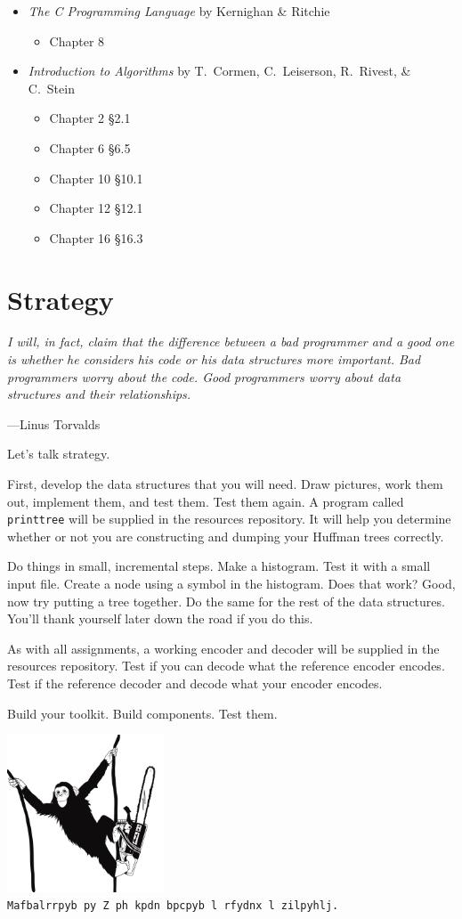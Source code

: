 \documentclass[11pt]{article}
\begin{document}
\begin{itemize}
  \item \textit{The C Programming Language} by Kernighan \& Ritchie
  \begin{itemize}
    \item Chapter 8
  \end{itemize}
  \item \textit{Introduction to Algorithms} by T.\ Cormen, C.\
    Leiserson, R.\ Rivest, \& C.\ Stein
    \begin{itemize}
      \item Chapter 2 \S 2.1
      \item Chapter 6 \S 6.5
      \item Chapter 10 \S 10.1
      \item Chapter 12 \S 12.1
      \item Chapter 16 \S 16.3
    \end{itemize}
\end{itemize}

\section{Strategy}

\epigraph{\emph{I will, in fact, claim that the difference between a bad
programmer and a good one is whether he considers his code or his data
structures more important. Bad programmers worry about the code. Good
programmers worry about data structures and their relationships.}}{---Linus
Torvalds}

\noindent Let's talk strategy.

First, develop the data structures that you will need. Draw pictures,
work them out, implement them, and test them. Test them again. A program
called \texttt{printtree} will be supplied in the resources repository. It
will help you determine whether or not you are constructing and dumping your Huffman
trees correctly.

Do things in small, incremental steps. Make a histogram. Test it with a
small input file. Create a node using a symbol in the histogram. Does
that work? Good, now try putting a tree together. Do the same for the
rest of the data structures. You'll thank yourself later down the road
if you do this.

As with all assignments, a working encoder and decoder will be supplied
in the resources repository. Test if you can decode what the reference
encoder encodes. Test if the reference decoder and decode what your
encoder encodes.

Build your toolkit. Build components. Test them.

\begin{center}
  \includegraphics[width=0.35\textwidth]{../../images/monkey-chainsaw.jpg} \\
  \vspace{10pt}
  \texttt{Mafbalrrpyb py Z ph kpdn bpcpyb l rfydnx l zilpyhlj.}
\end{center}
\end{document}
